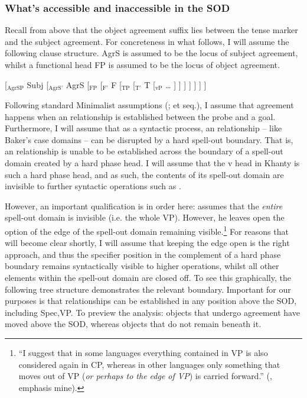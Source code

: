 \documentclass[output=paper
,modfonts
,nonflat]{langsci/langscibook}
\begin{document}
\subsubsection{What's accessible and inaccessible in the SOD}

Recall from above that the object agreement suffix lies between the tense marker and the subject agreement. For concreteness in what follows, I will assume the following clause structure. AgrS is assumed to be the locus of subject agreement, whilst a functional head FP is assumed to be the locus of object agreement.


\begin{exe}
\ex
{[$_{\textrm{AgrSP}}$ Subj [$_{\textrm{AgrS'}}$ AgrS [$_{\textrm{FP}}$  [$_{\textrm{F'}}$ F [$_{\textrm{TP}}$  [$_{\textrm{T'}}$ T [$_{\textrm{vP}}$ {\ldots} ] ] ] ] ] ] ]}
\end{exe}

\noindent Following standard Minimalist assumptions (\citealt{Chomsky2000,Chomsky2001}; et seq.), I assume that agreement happens when an \agree{} relationship is established between the probe and a goal.
Furthermore, I will assume that as a syntactic process, an \agree{} relationship -- like Baker's case domains -- can be disrupted by a hard spell-out boundary. That is, an \agree{} relationship is unable to be established across the boundary of a spell-out domain created by a hard phase head.
I will assume that the v head in Khanty is such a hard phase head, and as such, the contents of its spell-out domain are invisible to further syntactic operations such as \agree.

However, an important qualification is in order here: \citet{Baker2015} assumes that the \emph{entire} spell-out domain is invisible (i.e. the whole VP). However, he leaves open the option of the edge of the spell-out domain remaining visible.\footnote{``I suggest that in some languages everything contained in VP is also considered again in CP, whereas in other languages only something that moves out of VP (\emph{or perhaps to the edge of VP}) is carried forward.'' (\citealt[149]{Baker2015}, emphasis mine).}
For reasons that will become clear shortly, I will assume that keeping the edge open is the right approach, and thus the specifier position in the complement of a hard phase boundary remains syntactically visible to higher operations, whilst all other elements within the spell-out domain are closed off.
To see this graphically, the following tree structure demonstrates the relevant boundary.
Important for our purposes is that \agree{} relationships can be established in any position above the SOD, including Spec,VP.
To preview the analysis: objects that undergo agreement have moved above the SOD, whereas objects that do not remain beneath it.
\end{document}

